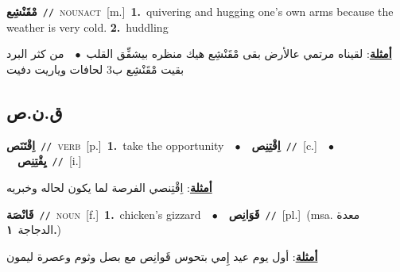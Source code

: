 \documentclass[10pt,a4paper,twoside]{article} %
\begin{document}
\begin{multicols}{2}
{\setlength\topsep{0pt}\textbf{\foreignlanguage{arabic}{مْقَنْشِع}}\ {\color{gray}\texttt{//}\color{black}}\ \textsc{noun\textunderscore act}\ [m.]\ \textbf{1.}~quivering and hugging one's own arms because the weather is very cold.  \textbf{2.}~huddling\  \begin{flushright}\color{gray}\foreignlanguage{arabic}{\textbf{\underline{\foreignlanguage{arabic}{أمثلة}}}: لقيناه مرتمي عالأرض بقى مْقَنْشِع هيك منظره بيشفِّق القلب\ $\bullet$\ \  من كثر البرد بقيت مْقَنْشِع ب3 لحافات وياريت دفيت}\end{flushright}\color{black}} \vspace{2mm}

\vspace{-3mm}
\subsection*{\color{blue}\foreignlanguage{arabic}{ق.ن.ص}\color{blue}{}} 

{\setlength\topsep{0pt}\textbf{\foreignlanguage{arabic}{اِقْتَنَص}}\ {\color{gray}\texttt{//}\color{black}}\ \textsc{verb}\ [p.]\ \textbf{1.}~take the opportunity\ \ $\bullet$\ \ \setlength\topsep{0pt}\textbf{\foreignlanguage{arabic}{اِقْتِنِص}}\ {\color{gray}\texttt{//}\color{black}}\ [c.]\ \ $\bullet$\ \ \setlength\topsep{0pt}\textbf{\foreignlanguage{arabic}{يِقْتِنِص}}\ {\color{gray}\texttt{//}\color{black}}\ [i.]\  \begin{flushright}\color{gray}\foreignlanguage{arabic}{\textbf{\underline{\foreignlanguage{arabic}{أمثلة}}}: اِقْتِنصي الفرصة لما يكون لحاله وخبريه}\end{flushright}\color{black}} \vspace{2mm}

{\setlength\topsep{0pt}\textbf{\foreignlanguage{arabic}{قَانْصَة}}\ {\color{gray}\texttt{//}\color{black}}\ \textsc{noun}\ [f.]\ \textbf{1.}~chicken's gizzard\ \ $\bullet$\ \ \setlength\topsep{0pt}\textbf{\foreignlanguage{arabic}{قَوَانِص}}\ {\color{gray}\texttt{//}\color{black}}\ [pl.]\ \color{gray}(msa. \foreignlanguage{arabic}{معدة الدجاجة}~\foreignlanguage{arabic}{\textbf{١.}})\color{black}\  \begin{flushright}\color{gray}\foreignlanguage{arabic}{\textbf{\underline{\foreignlanguage{arabic}{أمثلة}}}: أول يوم عيد إِمي بتحوس قَوانِص مع بصل وثوم وعصرة ليمون}\end{flushright}\color{black}} \vspace{2mm}


\end{multicols}
\end{document}

